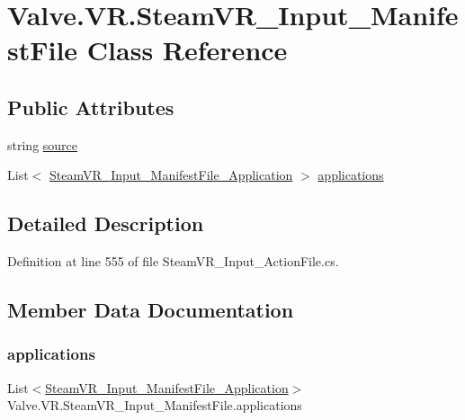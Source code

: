 \hypertarget{class_valve_1_1_v_r_1_1_steam_v_r___input___manifest_file}{}\section{Valve.\+V\+R.\+Steam\+V\+R\+\_\+\+Input\+\_\+\+Manifest\+File Class Reference}
\label{class_valve_1_1_v_r_1_1_steam_v_r___input___manifest_file}
\subsection*{Public Attributes}
\begin{DoxyCompactItemize}
\item 
string \mbox{\hyperlink{class_valve_1_1_v_r_1_1_steam_v_r___input___manifest_file_a0c1eeea5a4915ff8a36d2eb35450afac}{source}}
\item 
List$<$ \mbox{\hyperlink{class_valve_1_1_v_r_1_1_steam_v_r___input___manifest_file___application}{Steam\+V\+R\+\_\+\+Input\+\_\+\+Manifest\+File\+\_\+\+Application}} $>$ \mbox{\hyperlink{class_valve_1_1_v_r_1_1_steam_v_r___input___manifest_file_a0a9f34c92b414f3fa43c0aa4ce823195}{applications}}
\end{DoxyCompactItemize}


\subsection{Detailed Description}


Definition at line 555 of file Steam\+V\+R\+\_\+\+Input\+\_\+\+Action\+File.\+cs.



\subsection{Member Data Documentation}
\mbox{\label{class_valve_1_1_v_r_1_1_steam_v_r___input___manifest_file_a0a9f34c92b414f3fa43c0aa4ce823195}} 
\subsubsection{\texorpdfstring{applications}{applications}}
{\footnotesize\ttfamily List$<$\mbox{\hyperlink{class_valve_1_1_v_r_1_1_steam_v_r___input___manifest_file___application}{Steam\+V\+R\+\_\+\+Input\+\_\+\+Manifest\+File\+\_\+\+Application}}$>$ Valve.\+V\+R.\+Steam\+V\+R\+\_\+\+Input\+\_\+\+Manifest\+File.\+applications}



